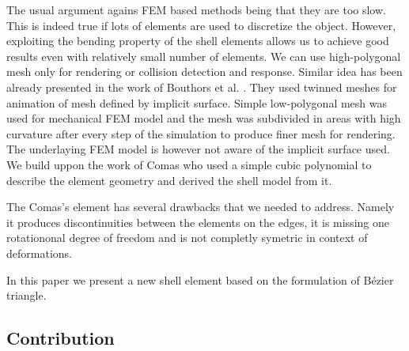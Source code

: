 \documentclass{egpubl}
\begin{document}
The usual argument agains FEM based methods being that they are too slow.
This is indeed true if lots of elements are used to discretize the object.
However, exploiting the bending property of the shell elements allows us to
achieve good results even with relatively small number of elements. We can
use high-polygonal mesh only for rendering or collision detection and
response. Similar idea has been already presented in the work of Bouthors
et al. \cite{Bouthors2007}. They used twinned meshes for animation of mesh
defined by implicit surface. Simple low-polygonal mesh was used for
mechanical FEM model and the mesh was subdivided in areas with high
curvature after every step of the simulation to produce finer mesh for
rendering. The underlaying FEM model is however not aware of the implicit
surface used. We build uppon the work of Comas \cite{Comas2010c} who used a
simple cubic polynomial to describe the element geometry and derived the
shell model from it.

The Comas's element has several drawbacks that we needed to address. Namely
it produces discontinuities between the elements on the edges, it is
missing one rotationonal degree of freedom and is not completly symetric in
context of deformations.


In this paper we present a new shell element based on the formulation of
Bézier triangle.

\subsection{Contribution}
\end{document}
